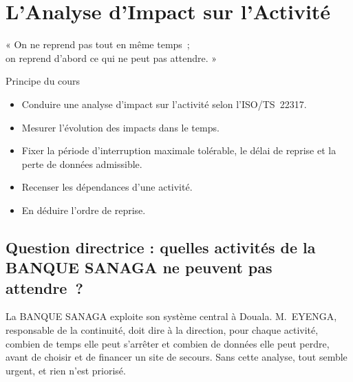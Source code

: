 
\chapter{L'Analyse d'Impact sur l'Activité}
\label{chap:bia}

\epigraph{%
    « On ne reprend pas tout en même temps~;\\
    on reprend d'abord ce qui ne peut pas attendre. »%
}{Principe du cours}


\begin{boxobjectifs}
\begin{itemize}
    \item Conduire une analyse d'impact sur l'activité selon l'ISO/TS~22317.
    \item Mesurer l'évolution des impacts dans le temps.
    \item Fixer la période d'interruption maximale tolérable, le délai de
          reprise et la perte de données admissible.
    \item Recenser les dépendances d'une activité.
    \item En déduire l'ordre de reprise.
\end{itemize}
\end{boxobjectifs}

\bigskip

\section*{Question directrice : quelles activités de la BANQUE SANAGA ne peuvent pas attendre~?}

La BANQUE SANAGA exploite son système central à Douala. M.~EYENGA,
responsable de la continuité, doit dire à la direction, pour chaque
activité, combien de temps elle peut s'arrêter et combien de données elle
peut perdre, avant de choisir et de financer un site de secours. Sans cette
analyse, tout semble urgent, et rien n'est priorisé.


